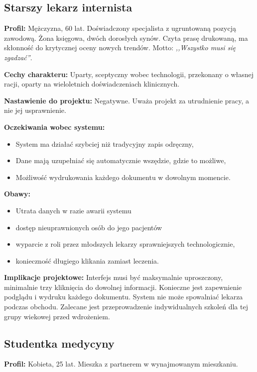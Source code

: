 \subsection{Starszy lekarz internista}

\textbf{Profil:} Mężczyzna, 60 lat. Doświadczony specjalista z ugruntowaną pozycją zawodową. Żona księgowa, dwóch dorosłych synów. Czyta prasę drukowaną, ma skłonność do krytycznej oceny nowych trendów. Motto: \emph{,,Wszystko musi się zgadzać''}.

\textbf{Cechy charakteru:} Uparty, sceptyczny wobec technologii, przekonany o własnej racji, oparty na wieloletnich doświadczeniach klinicznych.

\textbf{Nastawienie do projektu:} Negatywne. Uważa projekt za utrudnienie pracy, a nie jej usprawnienie.

\textbf{Oczekiwania wobec systemu:}
\begin{itemize}
    \item System ma działać szybciej niż tradycyjny zapis odręczny,
    \item Dane mają uzupełniać się automatycznie wszędzie, gdzie to możliwe,
    \item Możliwość wydrukowania każdego dokumentu w dowolnym momencie.
\end{itemize}

\textbf{Obawy:} 
\begin{itemize}
    \item Utrata danych w razie awarii systemu
    \item dostęp nieuprawnionych osób do jego pacjentów
    \item wyparcie z roli przez młodszych lekarzy sprawniejszych technologicznie,
    \item konieczność długiego klikania zamiast leczenia.
\end{itemize}

\textbf{Implikacje projektowe:} Interfejs musi być maksymalnie uproszczony, minimalnie trzy kliknięcia do dowolnej informacji. Konieczne jest zapewnienie podglądu i wydruku każdego dokumentu. System nie może spowalniać lekarza podczas obchodu. Zalecane jest przeprowadzenie indywidualnych szkoleń dla tej grupy wiekowej przed wdrożeniem.

\subsection{Studentka medycyny}

\textbf{Profil:} Kobieta, 25 lat. Mieszka z partnerem w wynajmowanym mieszkaniu.

